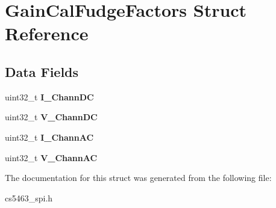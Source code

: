 \hypertarget{structGainCalFudgeFactors}{\section{Gain\-Cal\-Fudge\-Factors Struct Reference}
\label{structGainCalFudgeFactors}
}
\subsection*{Data Fields}
\begin{DoxyCompactItemize}
\item 
\hypertarget{structGainCalFudgeFactors_a9e42abcc9a05964e4d1b90a3b0ad4b0a}{uint32\-\_\-t {\bfseries I\-\_\-\-Chann\-D\-C}}\label{structGainCalFudgeFactors_a9e42abcc9a05964e4d1b90a3b0ad4b0a}

\item 
\hypertarget{structGainCalFudgeFactors_ad9dbfca9fdfbaa300274d7b89c52f199}{uint32\-\_\-t {\bfseries V\-\_\-\-Chann\-D\-C}}\label{structGainCalFudgeFactors_ad9dbfca9fdfbaa300274d7b89c52f199}

\item 
\hypertarget{structGainCalFudgeFactors_acd0ca0c17a5e0e087e031dbaae428264}{uint32\-\_\-t {\bfseries I\-\_\-\-Chann\-A\-C}}\label{structGainCalFudgeFactors_acd0ca0c17a5e0e087e031dbaae428264}

\item 
\hypertarget{structGainCalFudgeFactors_a5e9c7f403840e8c5982dfbae09427dd1}{uint32\-\_\-t {\bfseries V\-\_\-\-Chann\-A\-C}}\label{structGainCalFudgeFactors_a5e9c7f403840e8c5982dfbae09427dd1}

\end{DoxyCompactItemize}


The documentation for this struct was generated from the following file\-:\begin{DoxyCompactItemize}
\item 
cs5463\-\_\-spi.\-h\end{DoxyCompactItemize}
